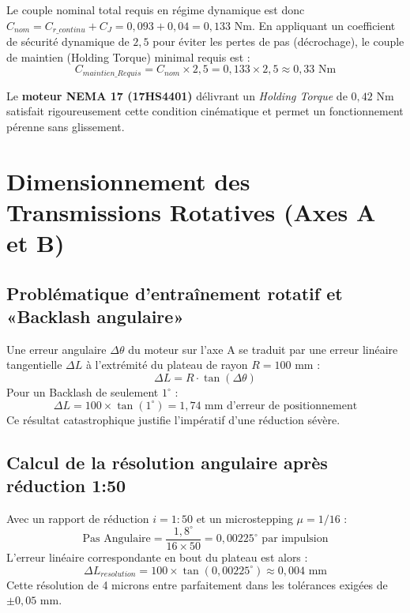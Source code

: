 Le couple nominal total requis en régime dynamique est donc $C_{nom} = C_{r\_continu} + C_J = 0{,}093 + 0{,}04 = 0{,}133 \text{ Nm}$.
En appliquant un coefficient de sécurité dynamique de $2{,}5$ pour éviter les pertes de pas (décrochage), le couple de maintien (Holding Torque) minimal requis est :
\begin{equation}
    C_{maintien\_Requis} = C_{nom} \times 2{,}5 = 0{,}133 \times 2{,}5 \approx \boxed{0{,}33 \text{ Nm}}
\end{equation}

Le \textbf{moteur NEMA 17 (17HS4401)} délivrant un \textit{Holding Torque} de $0{,}42 \text{ Nm}$ satisfait rigoureusement cette condition cinématique et permet un fonctionnement pérenne sans glissement.

\section{Dimensionnement des Transmissions Rotatives (Axes A et B)}

\subsection{Problématique d'entraînement rotatif et «Backlash angulaire»}
Une erreur angulaire $\Delta \theta$ du moteur sur l'axe A se traduit par une erreur linéaire tangentielle $\Delta L$ à l'extrémité du plateau de rayon $R = 100 \text{ mm}$ :
\begin{equation}
    \Delta L = R \cdot \tan(\Delta \theta)
\end{equation}
Pour un Backlash de seulement $1^\circ$ :
\begin{equation}
    \Delta L = 100 \times \tan(1^\circ) = \boxed{1{,}74 \text{ mm d'erreur de positionnement}}
\end{equation}
Ce résultat catastrophique justifie l'impératif d'une réduction sévère.

\subsection{Calcul de la résolution angulaire après réduction 1:50}
Avec un rapport de réduction $i = 1:50$ et un microstepping $\mu = 1/16$ :
\begin{equation}
    \text{Pas Angulaire} = \frac{1{,}8^\circ}{16 \times 50} = \boxed{0{,}00225^\circ \text{ par impulsion}}
\end{equation}
L'erreur linéaire correspondante en bout du plateau est alors :
\begin{equation}
    \Delta L_{resolution} = 100 \times \tan(0{,}00225^\circ) \approx \boxed{0{,}004 \text{ mm}}
\end{equation}
Cette résolution de 4 microns entre parfaitement dans les tolérances exigées de $\pm 0{,}05$ mm.

